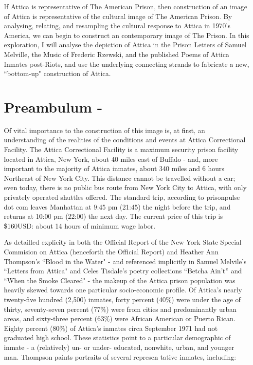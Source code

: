 \documentclass[14pt, letterpaper]{report}
\begin{document}
	If Attica is representative of The American Prison, then construction 
	of an image of Attica is representative of the cultural image of 
	The American Prison. By analysing, relating, and resampling the 
	cultural response to Attica in 1970's America, we can begin to 
	construct an contemporary image of The Prison. In this exploration, 
	I will analyse the depiction of Attica in the Prison Letters of 
	Samuel Melville, the Music of Frederic Rzewski, and the published 
	Poems of Attica Inmates post-Riots, and use the underlying connecting 
	strands to fabricate a new, ``bottom-up" construction of Attica. 
	
	\section*{Preambulum - }
	
	Of vital importance to the construction of this image is, at first, 
	an understanding of the realities of the conditions and events at 
	Attica Correctional Facility. The Attica Correctional Facility is a 
	maximum security prison facility located in Attica, New York, about 
	40 miles east of Buffalo - and, more important to the majority of 
	Attica inmates, about 340 miles and 6 hours Northeast of New York 
	City. This distance cannot be travelled without a car; even today, 
	there is no public bus route from New York City to Attica, with only 
    privately operated shuttles offered. The standard trip, according to 
    prisonpulse dot com leaves Manhattan at 9:45 pm (21:45) the night before the 
    trip, and returns at 10:00 pm (22:00) the next day. The current price of 
    this trip is \$160USD: about 14 hours of minimum wage labor. 
    
    As detailled explicity in both the Official Report of the New York State Special Commision on 
    Attica (henceforth the Official Report) and Heather Ann Thompson's ``Blood in the 
    Water" - and referenced implicitly in Samuel Melvile's ``Letters from Attica" and 
    Celes Tisdale's poetry collections ``Betcha Ain't'' and ``When the Smoke Cleared" - 
    the makeup of the Attica prison population was heavily skewed towards one particular 
    socio-economic profile. Of Attica's nearly twenty-five hundred (2,500) inmates, forty 
    percent (40\%) were under the age of thirty, seventy-seven percent (77\%) were from 
    cities and predominantly urban areas, and sixty-three percent (63\%) were African 
    American or Puerto Rican. Eighty percent (80\%) of Attica's inmates circa September 1971 
    had not graduated high school. \autocite[580]{blood-in-water}
    These statistics point to a particular demographic of 
    inmate - a (relatively) un- or under- educated, nonwhite, urban, and younger man. 
    Thompson paints portraits of several represen	tative inmates, including: 
    
\end{document}
